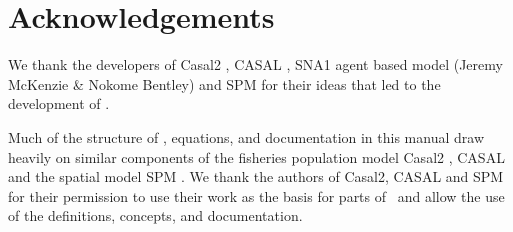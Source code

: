 \section{Acknowledgements\label{sec:acknowledgements}}

We thank the developers of Casal2 \citep{CASAL2}, CASAL \citep{1388}, SNA1 agent based model (Jeremy McKenzie \& Nokome Bentley) and SPM \citep{SPM} for their ideas that led to the development of \IBM. 

Much of the structure of \IBM, equations, and documentation in this manual draw heavily on similar components of the fisheries population model Casal2 \citep{CASAL2}, CASAL \citep{1388} and  the spatial model SPM \citep{SPM}. We thank the authors of Casal2, CASAL and SPM for their permission to use their work as the basis for parts of \IBM\ and allow the use of the definitions, concepts, and documentation. 

